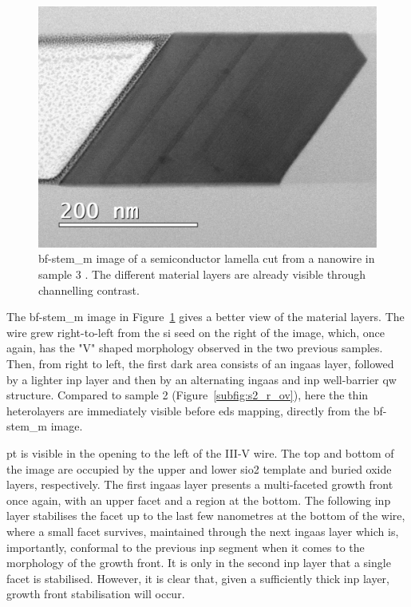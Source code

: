 \begin{figure}
    \centering
    \includegraphics[width=\textwidth]{3_Growth/s3_ov.pdf}
    \caption[\acs{bf}-\acs{stem_m} image of a semiconductor lamella cut from a nanowire in sample 3.]{\acs{bf}-\acs{stem_m} image of a semiconductor lamella cut from a nanowire in sample 3 \cite{Brugnolotto2023}. The different material layers are already visible through channelling contrast.}
    \label{fig:s3_ov}
\end{figure}

The \acs{bf}-\acs{stem_m} image in Figure~\ref{fig:s3_ov} gives a better view of the material layers. The wire grew right-to-left from the \acl{si} seed on the right of the image, which, once again, has the "V" shaped morphology observed in the two previous samples. Then, from right to left, the first dark area consists of an \acs{ingaas} layer, followed by a lighter \acs{inp} layer and then by an alternating \acs{ingaas} and \acs{inp} well-barrier \acl{qw} structure. Compared to sample 2 (Figure~\ref{subfig:s2_r_ov}), here the thin heterolayers are immediately visible before \acs{eds} mapping, directly from the \acs{bf}-\acs{stem_m} image.

\acl{pt} is visible in the opening to the left of the III-V wire. The top and bottom of the image are occupied by the upper and lower \acs{sio2} template and buried oxide layers, respectively. The first \acs{ingaas} layer presents a multi-faceted growth front once again, with an upper  facet and a  region at the bottom. The following \acs{inp} layer stabilises the  facet up to the last few nanometres at the bottom of the wire, where a small  facet survives, maintained through the next \acs{ingaas} layer which is, importantly, conformal to the previous \acs{inp} segment when it comes to the morphology of the growth front. It is only in the second \acs{inp} layer that a single  facet is stabilised. However, it is clear that, given a sufficiently thick \acs{inp} layer, growth front stabilisation will occur.

